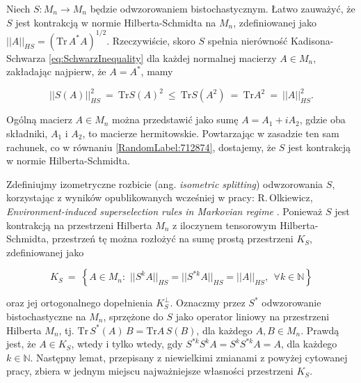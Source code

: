{\vspace{0.5cm}
Niech $S\!: M_{n} \rightarrow M_{n}$ będzie odwzorowaniem bistochastycznym.
Łatwo zauważyć, że $S$ jest kontrakcją w normie Hilberta-Schmidta
na $M_{n}$, zdefiniowanej jako
$||A||_{HS} = \left( \text{Tr} \, A^{*} A \right)^{1/2}$.
Rzeczywiście, skoro $S$ spełnia nierówność Kadisona-Schwarza
\eqref{eq:SchwarzInequality}
dla każdej normalnej macierzy $A \in M_{n}$,
zakładając najpierw, że $A = A^{*}$,
mamy
\begin{linenomath*}
 \begin{equation}
\label{RandomLabel:712874}
    || S(A) ||_{HS}^{2} \: = \: \text{Tr} S(A)^{2}
    \: \leq \:  \text{Tr} S(A^{2}) \: = \:
        \text{Tr} A^{2} \: = \: ||A||_{HS}^{2}.
 \end{equation}
\end{linenomath*}
Ogólną macierz $A \in M_{n}$ można przedstawić jako sumę
$A = A_{1} + i A_{2}$,
gdzie oba składniki, $A_{1}$ i $A_{2}$, to macierze hermitowskie.
Powtarzając w zasadzie ten sam rachunek, co w równaniu
\eqref{RandomLabel:712874},
dostajemy, że $S$ jest kontrakcją w normie Hilberta-Schmidta.

Zdefiniujmy izometryczne rozbicie (ang. \emph{isometric splitting})
odwzorowania $S$, korzystając z wyników opublikowanych wcześniej w pracy:
R.\,Olkiewicz, \emph{Environment-induced superselection rules in Markovian regime}
\cite{olkiewicz1999environment}.
Ponieważ $S$ jest kontrakcją na przestrzeni Hilberta $M_{n}$
z iloczynem tensorowym Hilberta-Schmidta,
przestrzeń tę można rozłożyć na sumę prostą przestrzeni $K_{S}$,
zdefiniowanej jako
\begin{linenomath*}
 \begin{equation}
\label{def:definitionofK}
    K_{S} \: = \: \left\{
        A \in M_{n}: \,\,
            || S^{k} A ||_{HS} = || S^{* k} A ||_{HS} = || A ||_{HS}, \:\:
            \forall k \in \mathbb{N}
        \right\}
 \end{equation}
\end{linenomath*}
oraz jej ortogonalnego dopełnienia $K_{S}^{\perp}$.
Oznaczmy przez $S^{*}$ odwzorowanie bistochastyczne na $M_{n}$,
sprzężone do $S$ jako operator liniowy na przestrzeni Hilberta $M_{n}$,
tj. $\text{Tr}\, S^{*} (A)\, B = \text{Tr} A \, S(B)$,
dla każdego $A, B \in M_{n}$.
Prawdą jest, że $A \in K_{S}$,
wtedy i tylko wtedy, gdy
$S^{* k} S^{k} A = S^{k} S^{* k} A = A$,
dla każdego $k \in \mathbb{N}$.
Następny lemat, przepisany z niewielkimi zmianami z
powyżej cytowanej pracy,
zbiera w jednym miejscu najważniejsze własności przestrzeni $K_{S}$.

}
